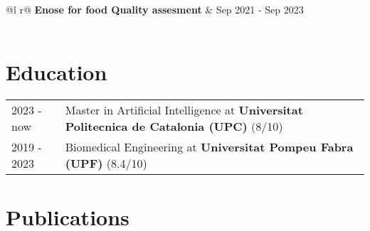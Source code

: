\documentclass[a4paper,12pt]{article}
\begin{document}
\begin{tabularx}{\linewidth}{ @{}l r@{} }
\textbf{Enose for food Quality assesment} & \hfill Sep 2021 - Sep 2023 \\[3.75pt]
  \\
\end{tabularx}

\section{Education}
\begin{tabularx}{\linewidth}{@{}l X@{}}	
2023 - now & Master in Artificial Intelligence at \textbf{Universitat Politecnica de Catalonia (UPC)} \hfill \normalsize (8/10) \\
2019 - 2023 & Biomedical Engineering at \textbf{Universitat Pompeu Fabra (UPF)} \hfill (8.4/10) \\ 
\end{tabularx}

\section{Publications}
\begin{refsection}
\nocite{UTI2024}
\nocite{honey2023}
\nocite{wine2022}
\printbibliography[heading=none]
\end{refsection}

\vfill
{}
\end{document}
